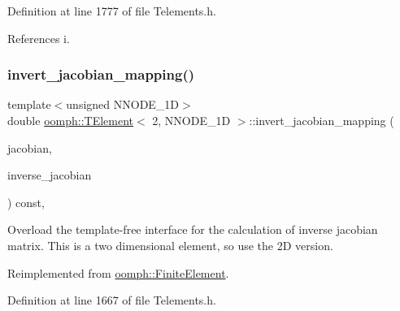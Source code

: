 Definition at line 1777 of file Telements.\+h.



References i.

\mbox{\label{classoomph_1_1TElement_3_012_00_01NNODE__1D_01_4_a80334f2ec7d9f8795b9e260d185194d3}} 
\subsubsection{\texorpdfstring{invert\+\_\+jacobian\+\_\+mapping()}{invert\_jacobian\_mapping()}}
{\footnotesize\ttfamily template$<$unsigned N\+N\+O\+D\+E\+\_\+1D$>$ \\
double \hyperlink{classoomph_1_1TElement}{oomph\+::\+T\+Element}$<$ 2, N\+N\+O\+D\+E\+\_\+1D $>$\+::invert\+\_\+jacobian\+\_\+mapping (\begin{DoxyParamCaption}\item[{const \hyperlink{classoomph_1_1DenseMatrix}{Dense\+Matrix}$<$ double $>$ \&}]{jacobian,  }\item[{\hyperlink{classoomph_1_1DenseMatrix}{Dense\+Matrix}$<$ double $>$ \&}]{inverse\+\_\+jacobian }\end{DoxyParamCaption}) const\hspace{0.3cm}{\ttfamily [inline]}, {\ttfamily [virtual]}}



Overload the template-\/free interface for the calculation of inverse jacobian matrix. This is a two dimensional element, so use the 2D version. 



Reimplemented from \hyperlink{classoomph_1_1FiniteElement_a42c86a7628fee00d3a9d35b935b29e48}{oomph\+::\+Finite\+Element}.



Definition at line 1667 of file Telements.\+h.

\mbox{\label{classoomph_1_1TElement_3_012_00_01NNODE__1D_01_4_acf3c8a84331e4ff80a9b270124a2730b}} 
